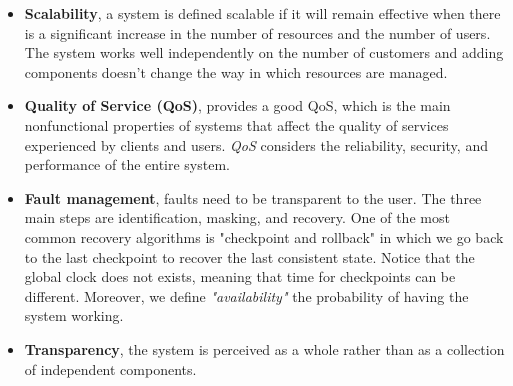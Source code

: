 \documentclass[11pt,a4paper]{article}
\begin{document}
\begin{itemize}
    \item \textbf{Scalability}, a system is defined scalable if it will remain effective when there is a significant increase in the number of resources and the number of users. The system works well independently on the number of customers and adding components doesn't change the way in which resources are managed.
    \item \textbf{Quality of Service (QoS)}, provides a good QoS, which is the main nonfunctional properties of systems that affect the quality of services experienced by clients and users. \textit{QoS} considers the reliability, security, and performance of the entire system.
    \item \textbf{Fault management}, faults need to be transparent to the user. The three main steps are identification, masking, and recovery. One of the most common recovery algorithms is "checkpoint and rollback" in which we go back to the last checkpoint to recover the last consistent state. Notice that the global clock does not exists, meaning that time for checkpoints can be different. Moreover, we define \textit{"availability"} the probability of having the system working.
    \item \textbf{Transparency}, the system is perceived as a whole rather than as a collection of independent components.
\end{itemize}
\end{document}
